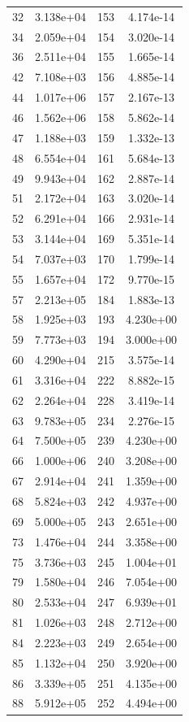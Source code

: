 \documentclass[12pt]{article}
\begin{document}
\begin{longtable}{@{}cccc@{}}
32 & 3.138e+04 & 153 & 4.174e-14 \\
34 & 2.059e+04 & 154 & 3.020e-14 \\
36 & 2.511e+04 & 155 & 1.665e-14 \\
42 & 7.108e+03 & 156 & 4.885e-14 \\
44 & 1.017e+06 & 157 & 2.167e-13 \\
46 & 1.562e+06 & 158 & 5.862e-14 \\
47 & 1.188e+03 & 159 & 1.332e-13 \\
48 & 6.554e+04 & 161 & 5.684e-13 \\
49 & 9.943e+04 & 162 & 2.887e-14 \\
51 & 2.172e+04 & 163 & 3.020e-14 \\
52 & 6.291e+04 & 166 & 2.931e-14 \\
53 & 3.144e+04 & 169 & 5.351e-14 \\
54 & 7.037e+03 & 170 & 1.799e-14 \\
55 & 1.657e+04 & 172 & 9.770e-15 \\
57 & 2.213e+05 & 184 & 1.883e-13 \\
58 & 1.925e+03 & 193 & 4.230e+00 \\
59 & 7.773e+03 & 194 & 3.000e+00 \\
60 & 4.290e+04 & 215 & 3.575e-14 \\
61 & 3.316e+04 & 222 & 8.882e-15 \\
62 & 2.264e+04 & 228 & 3.419e-14 \\
63 & 9.783e+05 & 234 & 2.276e-15 \\
64 & 7.500e+05 & 239 & 4.230e+00 \\
66 & 1.000e+06 & 240 & 3.208e+00 \\
67 & 2.914e+04 & 241 & 1.359e+00 \\
68 & 5.824e+03 & 242 & 4.937e+00 \\
69 & 5.000e+05 & 243 & 2.651e+00 \\
73 & 1.476e+04 & 244 & 3.358e+00 \\
75 & 3.736e+03 & 245 & 1.004e+01 \\
79 & 1.580e+04 & 246 & 7.054e+00 \\
80 & 2.533e+04 & 247 & 6.939e+01 \\
81 & 1.026e+03 & 248 & 2.712e+00 \\
84 & 2.223e+03 & 249 & 2.654e+00 \\
85 & 1.132e+04 & 250 & 3.920e+00 \\
86 & 3.339e+05 & 251 & 4.135e+00 \\
88 & 5.912e+05 & 252 & 4.494e+00 \\

\end{longtable}
\end{document}
